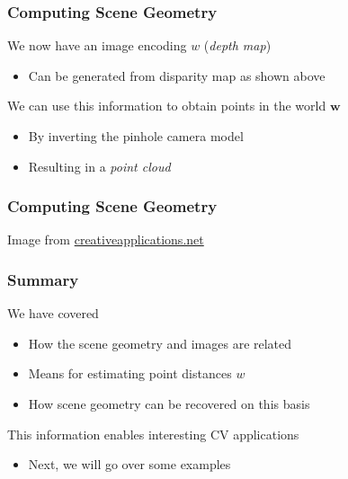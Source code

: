 \documentclass[xetex,professionalfont]{beamer}
\renewcommand{\vec}[1]{\ensuremath{\mathbf{#1}}}
\newcommand{\vw}{\vec{w}}
\begin{document}

\begin{frame}
\frametitle{Computing Scene Geometry}

We now have an image encoding $w$ (\emph{depth map})
\begin{itemize}
    \item Can be generated from disparity map as shown above
\end{itemize}

\bigskip
We can use this information to obtain points in the world $\vw$
\begin{itemize}
    \item By inverting the pinhole camera model
    \item Resulting in a \emph{point cloud}
\end{itemize}

\end{frame}


\begin{frame}
\frametitle{Computing Scene Geometry}

\begin{center}
    {\centering Image from \url{creativeapplications.net}}
\end{center}

\end{frame}


\begin{frame}
\frametitle{Summary}

We have covered
\begin{itemize}
    \item How the scene geometry and images are related
    \item Means for estimating point distances $w$
    \item How scene geometry can be recovered on this basis
\end{itemize}

\bigskip
This information enables interesting CV applications
\begin{itemize}
    \item Next, we will go over some examples
\end{itemize}

\end{frame}
\end{document}
